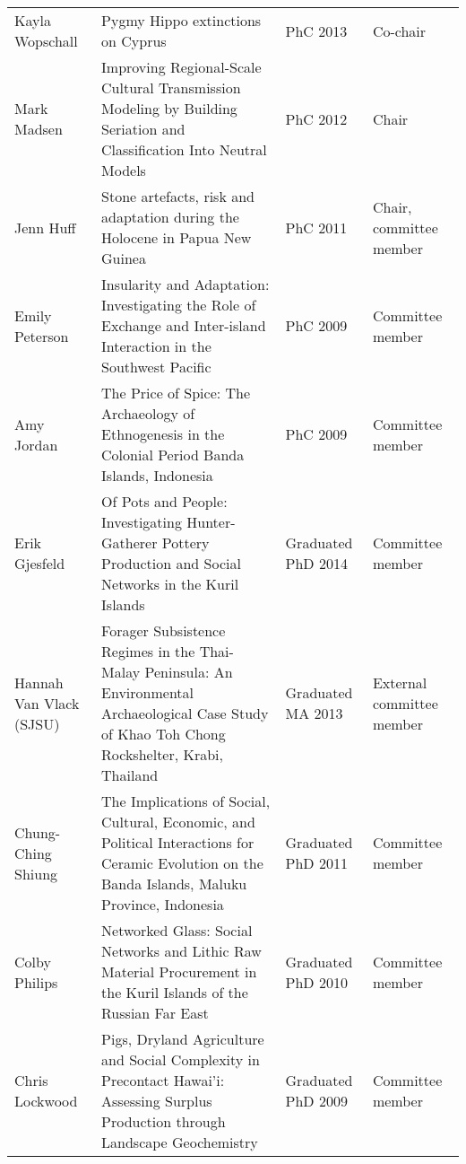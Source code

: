 \documentclass[11pt,article,oneside,oldfontcommands]{memoir}
\begin{document}
\begin{Spacing}{0.7}
\begin{center}
\begin{longtable}{ l L{6cm} p{2cm}  p{2cm} }
    Kayla Wopschall         & Pygmy Hippo extinctions on Cyprus                                                                                                                            & PhC 2013           & Co-chair                       \\
    Mark Madsen             & Improving Regional-Scale Cultural Transmission Modeling by Building Seriation and Classification Into Neutral Models                                         & PhC 2012           & Chair                          \\
    Jenn Huff               & Stone artefacts, risk and adaptation during the Holocene in Papua New Guinea                                                                                 & PhC 2011           & Chair, committee member        \\
    Emily Peterson          & Insularity and Adaptation: Investigating the Role of Exchange and Inter-island Interaction in the Southwest Pacific                                          & PhC 2009           & Committee member               \\
    Amy Jordan              & The Price of Spice: The Archaeology of Ethnogenesis in the Colonial Period Banda Islands, Indonesia                                                          & PhC 2009           & Committee member               \\
    Erik Gjesfeld           & Of Pots and People: Investigating Hunter-Gatherer Pottery Production and Social Networks in the Kuril Islands                                                & Graduated PhD 2014 & Committee member               \\
    Hannah Van Vlack (SJSU) & Forager Subsistence Regimes in the Thai-Malay Peninsula: An Environmental Archaeological Case Study of Khao Toh Chong Rockshelter, Krabi, Thailand           & Graduated MA 2013  & External committee member      \\
    Chung-Ching Shiung      & The Implications of Social, Cultural, Economic, and Political Interactions for Ceramic Evolution on the Banda Islands, Maluku Province, Indonesia            & Graduated PhD 2011 & Committee member              \\
    Colby Philips           & Networked Glass: Social Networks and Lithic Raw Material Procurement in the Kuril Islands of the Russian Far East                                            & Graduated PhD 2010 & Committee member               \\
    Chris Lockwood          & Pigs, Dryland Agriculture and Social Complexity in Precontact Hawai'i: Assessing Surplus Production through Landscape Geochemistry                           & Graduated PhD 2009 & Committee member               \\
        \bottomrule
    \end{longtable}
\end{center}
\end{Spacing}
\end{document}
